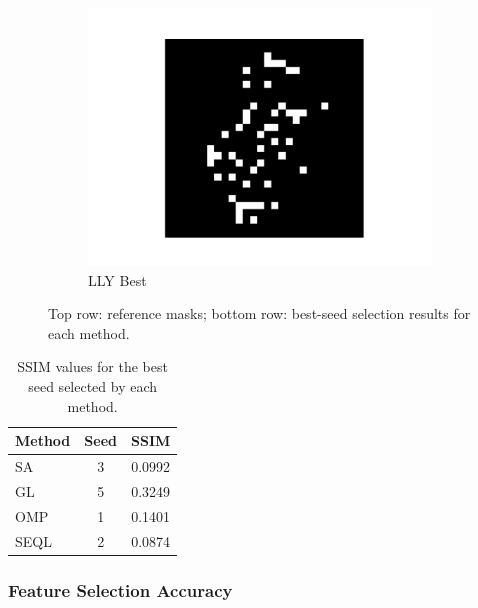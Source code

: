 \documentclass[a4paper,twocolumn]{article} %
\begin{document}
\begin{figure}[h!]
\begin{subfigure}[t]{0.19\linewidth}
        \includegraphics[width=\linewidth]{figures/best_seed_lly.pdf}
        \caption*{LLY Best}
    \end{subfigure}

    \caption{Top row: reference masks; bottom row: best-seed selection results for each method.}
    \label{fig:feature_masks}
\end{figure}


\begin{table}[ht]
    \centering
    \begin{tabular}{lcc}
        \hline
        \textbf{Method} & \textbf{Seed} & \textbf{SSIM} \\
        \hline
        SA    & 3 & 0.0992 \\
        GL    & 5 & 0.3249 \\
        OMP   & 1 & 0.1401 \\
        SEQL  & 2 & 0.0874 \\
        \hline
    \end{tabular}
    \caption{SSIM values for the best seed selected by each method.}
    \label{tab:ssim_results}
\end{table}


\subsubsection{Feature Selection Accuracy}
\end{document}
